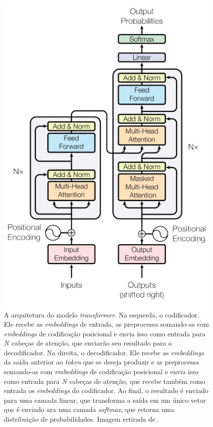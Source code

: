 \begin{figure}[h]
\centering
\includegraphics[scale=0.6]{Res/transformers-img1.jpg}
\caption{A arquitetura do modelo \textit{transformer}. Na esquerda, o
codificador. Ele recebe as \textit{embeddings} de entrada, as preprocessa
somando-as com \textit{embeddings} de codificação posicional e envia isso como
entrada para $N$ cabeças de atenção, que enviarão seu resultado para o
decodificador. Na direita, o decodificador. Ele recebe as \textit{embeddings} da
saída anterior ao \textit{token} que se deseja produzir e as preprocessa
somando-as com \textit{embeddings} de codificação posicional e envia isso como
entrada para $N$ cabeças de atenção, que recebe também como entrada os
\textit{embeddings} do codificador. Ao final, o resultado é enviado para uma
camada linear, que transforma a saída em um único vetor que é enviado ara uma
camada \textit{softmax}, que retorna uma distribuição de probabilidades. Imagem
retirada de \cite{vaswani-etal:2017:attention-is-all-you-need}.}
\label{transformers-img1.jpg}
\end{figure}

